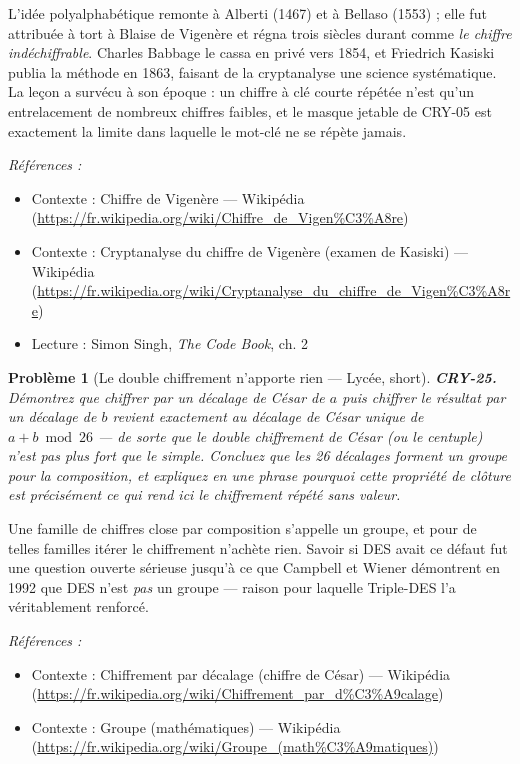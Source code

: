\documentclass[11pt]{article}
\newtheorem{problem}{Problème}
\newenvironment{refs}{\par\small\noindent\emph{Références :}\begin{itemize}\setlength\itemsep{0pt}}{\end{itemize}\normalsize}
\begin{document}
\noindent L'idée polyalphabétique remonte à Alberti (1467) et à Bellaso
(1553) ; elle fut attribuée à tort à Blaise de Vigenère et régna trois siècles durant
comme \textit{le chiffre indéchiffrable}. Charles Babbage le cassa en privé vers 1854, et
Friedrich Kasiski publia la méthode en 1863, faisant de la cryptanalyse une science
systématique. La leçon a survécu à son époque : un chiffre à clé courte répétée n'est qu'un
entrelacement de nombreux chiffres faibles, et le masque jetable de CRY-05 est exactement la
limite dans laquelle le \og{} mot-clé \fg{} ne se répète jamais.

\begin{refs}
\item Contexte : Chiffre de Vigenère --- Wikipédia (\url{https://fr.wikipedia.org/wiki/Chiffre_de_Vigen%C3%A8re})
\item Contexte : Cryptanalyse du chiffre de Vigenère (examen de Kasiski) --- Wikipédia (\url{https://fr.wikipedia.org/wiki/Cryptanalyse_du_chiffre_de_Vigen%C3%A8re})
\item Lecture : Simon Singh, \textit{The Code Book}, ch. 2
\end{refs}

\bigskip

\begin{problem}[{Le double chiffrement n'apporte rien --- Lycée, short}]
\textbf{CRY-25.} Démontrez que chiffrer par un décalage de César de
$a$ puis chiffrer le résultat par un décalage de $b$ revient exactement au décalage de
César unique de $a + b \bmod 26$ --- de sorte que le double chiffrement de César (ou le
centuple) n'est pas plus fort que le simple. Concluez que les 26 décalages forment un groupe
pour la composition, et expliquez en une phrase pourquoi cette propriété de clôture est
précisément ce qui rend ici le chiffrement répété sans valeur.
\end{problem}

\noindent Une famille de chiffres close par composition s'appelle un groupe, et pour
de telles familles itérer le chiffrement n'achète rien. Savoir si DES avait ce défaut fut une
question ouverte sérieuse jusqu'à ce que Campbell et Wiener démontrent en 1992 que DES n'est
\textit{pas} un groupe --- raison pour laquelle Triple-DES l'a véritablement renforcé.

\begin{refs}
\item Contexte : Chiffrement par décalage (chiffre de César) --- Wikipédia (\url{https://fr.wikipedia.org/wiki/Chiffrement_par_d%C3%A9calage})
\item Contexte : Groupe (mathématiques) --- Wikipédia (\url{https://fr.wikipedia.org/wiki/Groupe_(math%C3%A9matiques)})
\end{refs}
\end{document}
